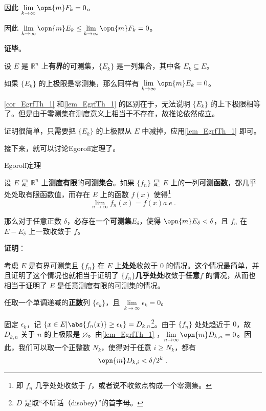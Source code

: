 因此 $\lim\limits_{k\to\infty}\opn{m}F_k=0$。

因此 $\lim\limits_{k\to\infty}\opn{m}E_k\leq\lim\limits_{k\to\infty}\opn{m}F_k=0$。


\textbf{证毕}。

\begin{corollary}{}\label{cor_EgrfTh_1}
设 $E$ 是 $\mathbb{R}^n$ 上\textbf{有界}的可测集，$\{E_k\}$ 是一列集合，其中各 $E_k\subseteq E$。

如果 $\{E_k\}$ 的上极限是零测集，那么同样有 $\lim\limits_{k\to\infty}\opn{m}E_k=0$。
\end{corollary}

\autoref{cor_EgrfTh_1} 和\autoref{lem_EgrfTh_1} 的区别在于，无法说明 $\{E_k\}$ 的上下极限相等了。但是由于零测集在测度意义上相当于不存在，故推论依然成立。

证明很简单，只需要把 $\{E_k\}$ 的上极限从 $E$ 中减掉，应用\autoref{lem_EgrfTh_1} 即可。





接下来，就可以讨论Egoroff定理了。


\begin{theorem}{Egoroff定理}\label{the_EgrfTh_1}

设 $E$ 是 $\mathbb{R}^n$ 上\textbf{测度有限}的\textbf{可测集合}。如果 $\{f_n\}$ 是 $E$ 上的一列\textbf{可测函数}，都几乎处处取有限函数值，而存在 $E$ 上的函数 $f(x)$ 使得\footnote{即 $f_n$ 几乎处处收敛于 $f$，或者说不收敛点构成一个零测集。}\begin{equation}
\lim\limits_{n\to\infty}f_n(x)=f(x)a. e~. 
\end{equation}

那么对于任意正数 $\delta$，必存在一个\textbf{可测集}$E_\delta$，使得 $\opn{m}E_\delta<\delta$，且 $f_n$ 在 $E-E_\delta$ 上一致收敛于 $f$。

\end{theorem}

\textbf{证明}：

考虑 $E$ 是有界可测集且 $\{f_n\}$ 在 $E$ 上\textbf{处处}收敛于 $0$ 的情况。这个情况最简单，并且证明了这个情况也就相当于证明了 $\{f_n\}$\textbf{几乎处处}收敛于\textbf{任意}$f$ 的情况，从而也相当于证明了 $E$ 是任意测度有限的可测集的情况。



任取一个单调递减的\textbf{正数}列 $\{\epsilon_k\}$，且 $\lim\limits_{k\to\infty}\epsilon_k=0$。

固定 $\epsilon_k$，记 $\{x\in E|\abs{f_n(x)}\geq\epsilon_k\}=D_{k, n}$\footnote{$D$ 是取“不听话（disobey）”的首字母。}。由于 $\{f_n\}$ 处处趋近于 $0$，故 $D_{k, n}$ 关于 $n$ 的上极限是 $\varnothing$。由\autoref{lem_EgrfTh_1} ，$\lim\limits_{n\to\infty}\opn{m}D_{k, n}=0$。因此，我们可以取一个正整数 $N_k$，使得对于任意 $i\geq N_k$，都有
\begin{equation}\label{eq_EgrfTh_2}
\opn{m}D_{k, i}<\delta/2^k~.
\end{equation}

